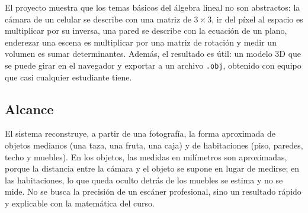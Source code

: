 El proyecto muestra que los temas básicos del álgebra lineal no son abstractos:
la cámara de un celular se describe con una matriz de $3\times3$, ir del píxel
al espacio es multiplicar por su inversa, una pared se describe con la
ecuación de un plano, enderezar una escena es multiplicar por una matriz de
rotación y medir un volumen es sumar determinantes. Además, el
resultado es útil: un modelo 3D que se puede girar en el navegador y exportar
a un archivo \texttt{.obj}, obtenido con equipo que casi cualquier estudiante
tiene.

\subsection{Alcance}

El sistema reconstruye, a partir de una fotografía, la forma aproximada de
objetos medianos (una taza, una fruta, una caja) y de habitaciones (piso,
paredes, techo y muebles). En los objetos, las medidas en milímetros son
aproximadas, porque la distancia entre la cámara y el objeto se supone en
lugar de medirse; en las habitaciones, lo que queda oculto detrás de los
muebles se estima y no se mide. No se busca la precisión de un escáner
profesional, sino un resultado rápido y explicable con la matemática del
curso.
